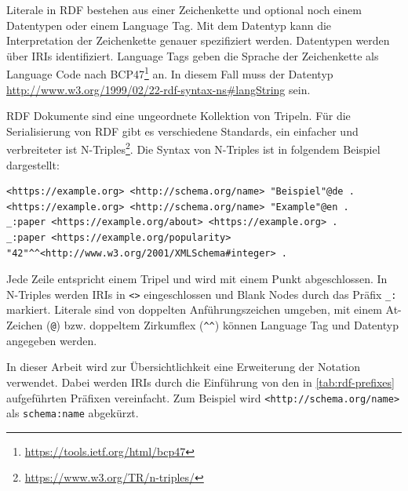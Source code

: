 Literale in RDF bestehen aus einer Zeichenkette und optional noch einem Datentypen oder einem Language Tag.
Mit dem Datentyp kann die Interpretation der Zeichenkette genauer spezifiziert werden.
Datentypen werden über IRIs identifiziert.
Language Tags geben die Sprache der Zeichenkette als Language Code nach BCP47\footnote{\url{https://tools.ietf.org/html/bcp47}} an.
In diesem Fall muss der Datentyp \url{http://www.w3.org/1999/02/22-rdf-syntax-ns#langString} sein.

RDF Dokumente sind eine ungeordnete Kollektion von Tripeln.
Für die Serialisierung von RDF gibt es verschiedene Standards, ein einfacher und verbreiteter ist N-Triples\footnote{\url{https://www.w3.org/TR/n-triples/}}.
Die Syntax von N-Triples ist in folgendem Beispiel dargestellt:
\begin{lstlisting}[language=SPARQL, breaklines=true]
<https://example.org> <http://schema.org/name> "Beispiel"@de .
<https://example.org> <http://schema.org/name> "Example"@en .
_:paper <https://example.org/about> <https://example.org> .
_:paper <https://example.org/popularity> "42"^^<http://www.w3.org/2001/XMLSchema#integer> .
\end{lstlisting}
Jede Zeile entspricht einem Tripel und wird mit einem Punkt abgeschlossen.
In N-Triples werden IRIs in \verb|<>| eingeschlossen und Blank Nodes durch das Präfix \verb|_:| markiert.
Literale sind von doppelten Anführungszeichen umgeben, mit einem At-Zeichen (\verb|@|) bzw. doppeltem Zirkumflex (\verb|^^|) können Language Tag und Datentyp angegeben werden.

In dieser Arbeit wird zur Übersichtlichkeit eine Erweiterung der Notation verwendet.
Dabei werden IRIs durch die Einführung von den in \cref{tab:rdf-prefixes} aufgeführten Präfixen vereinfacht.
Zum Beispiel wird \verb|<http://schema.org/name>| als \verb|schema:name| abgekürzt. 


